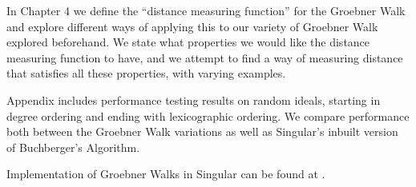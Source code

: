 \documentclass[12pt,a4paper]{report}
\begin{document}
In Chapter 4 we define the ``distance measuring function'' for the Groebner Walk and explore different ways of applying this to our variety of Groebner Walk explored beforehand. We state what properties we would like the distance measuring function to have, and we attempt to find a way of measuring distance that satisfies all these properties, with varying examples.

Appendix includes performance testing results on random ideals, starting in degree ordering and ending with lexicographic ordering. We compare performance both between the Groebner Walk variations as well as Singular's inbuilt version of Buchberger's Algorithm.

Implementation of Groebner Walks in Singular can be found at \cite{GroebnerCode}.
\end{document}
